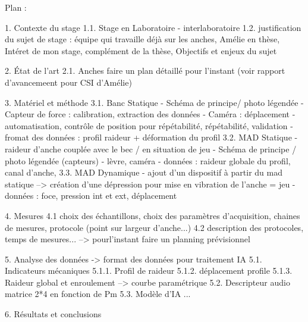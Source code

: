 Plan :


1. Contexte du stage 
    1.1. Stage en Laboratoire - interlaboratoire
    1.2. justification du sujet de stage : équipe qui travaille déjà sur les anches, Amélie en thèse, Intéret de mon stage, complément de la thèse, Objectifs et enjeux du sujet
    
2. État de l'art 
     2.1. Anches
     faire un plan détaillé pour l'instant (voir rapport d'avancemeent pour CSI d'Amélie)


3. Matériel et méthode
    3.1. Banc Statique
        - Schéma de principe/ photo légendée
        - Capteur de force : calibration, extraction des données
        - Caméra : déplacement
        - automatisation, contrôle de position pour répétabilité, répétabilité, validation 
        - fromat des données : profil raideur + déformation du profil
    3.2. MAD Statique - raideur d'anche couplée avec le bec / en situation de jeu
        - Schéma de principe / photo légendée (capteurs)
        - lèvre, caméra
        - données : raideur globale du profil, canal d'anche,
    3.3. MAD Dynamique
        - ajout d'un dispositif à partir du mad statique --> création d'une dépression pour mise en vibration de l'anche = jeu 
        - données : foce, pression int et ext, déplacement 

4. Mesures 
    4.1 choix des échantillons, choix des paramètres d'acquisition, chaines de mesures, protocole (point sur largeur d'anche...)
    4.2 description des protocoles, temps de mesures... --> pourl'instant faire un planning prévisionnel

5. Analyse des données -> format des données pour traitement IA
    5.1. Indicateurs mécaniques 
        5.1.1. Profil de raideur 
        5.1.2. déplacement profile
        5.1.3. Raideur global et enroulement --> courbe paramétrique
    5.2. Descripteur audio
        matrice 2*4 en fonction de Pm
    5.3. Modèle d'IA ...
    
6. Résultats et conclusions